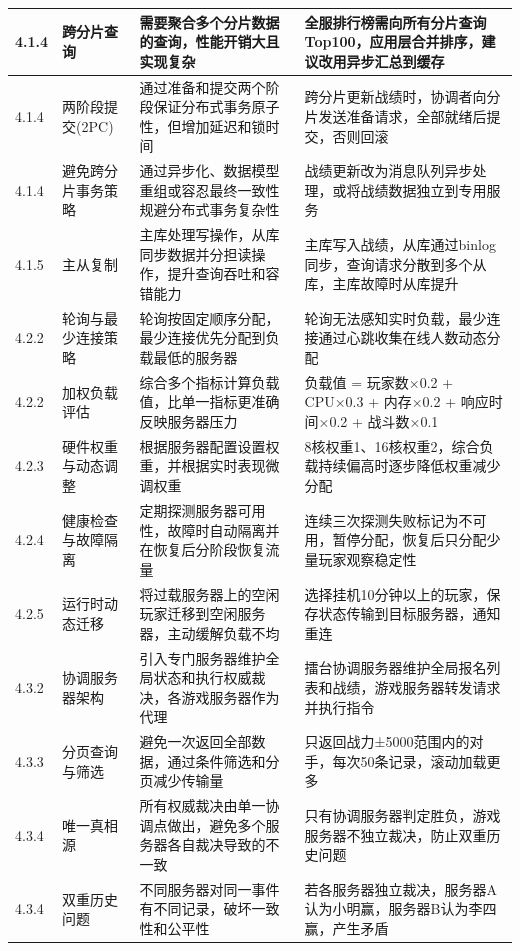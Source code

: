 \begin{longtable}{p{2.5cm}p{3cm}p{4.5cm}p{4.5cm}}
\hline
4.1.4 & 跨分片查询 & 需要聚合多个分片数据的查询，性能开销大且实现复杂 & 全服排行榜需向所有分片查询Top100，应用层合并排序，建议改用异步汇总到缓存 \\
\hline
4.1.4 & 两阶段提交(2PC) & 通过准备和提交两个阶段保证分布式事务原子性，但增加延迟和锁时间 & 跨分片更新战绩时，协调者向分片发送准备请求，全部就绪后提交，否则回滚 \\
\hline
4.1.4 & 避免跨分片事务策略 & 通过异步化、数据模型重组或容忍最终一致性规避分布式事务复杂性 & 战绩更新改为消息队列异步处理，或将战绩数据独立到专用服务 \\
\hline
4.1.5 & 主从复制 & 主库处理写操作，从库同步数据并分担读操作，提升查询吞吐和容错能力 & 主库写入战绩，从库通过binlog同步，查询请求分散到多个从库，主库故障时从库提升 \\
\hline
4.2.2 & 轮询与最少连接策略 & 轮询按固定顺序分配，最少连接优先分配到负载最低的服务器 & 轮询无法感知实时负载，最少连接通过心跳收集在线人数动态分配 \\
\hline
4.2.2 & 加权负载评估 & 综合多个指标计算负载值，比单一指标更准确反映服务器压力 & 负载值 = 玩家数×0.2 + CPU×0.3 + 内存×0.2 + 响应时间×0.2 + 战斗数×0.1 \\
\hline
4.2.3 & 硬件权重与动态调整 & 根据服务器配置设置权重，并根据实时表现微调权重 & 8核权重1、16核权重2，综合负载持续偏高时逐步降低权重减少分配 \\
\hline
4.2.4 & 健康检查与故障隔离 & 定期探测服务器可用性，故障时自动隔离并在恢复后分阶段恢复流量 & 连续三次探测失败标记为不可用，暂停分配，恢复后只分配少量玩家观察稳定性 \\
\hline
4.2.5 & 运行时动态迁移 & 将过载服务器上的空闲玩家迁移到空闲服务器，主动缓解负载不均 & 选择挂机10分钟以上的玩家，保存状态传输到目标服务器，通知重连 \\
\hline
4.3.2 & 协调服务器架构 & 引入专门服务器维护全局状态和执行权威裁决，各游戏服务器作为代理 & 擂台协调服务器维护全局报名列表和战绩，游戏服务器转发请求并执行指令 \\
\hline
4.3.3 & 分页查询与筛选 & 避免一次返回全部数据，通过条件筛选和分页减少传输量 & 只返回战力±5000范围内的对手，每次50条记录，滚动加载更多 \\
\hline
4.3.4 & 唯一真相源 & 所有权威裁决由单一协调点做出，避免多个服务器各自裁决导致的不一致 & 只有协调服务器判定胜负，游戏服务器不独立裁决，防止双重历史问题 \\
\hline
4.3.4 & 双重历史问题 & 不同服务器对同一事件有不同记录，破坏一致性和公平性 & 若各服务器独立裁决，服务器A认为小明赢，服务器B认为李四赢，产生矛盾 \\
\hline

\end{longtable}
